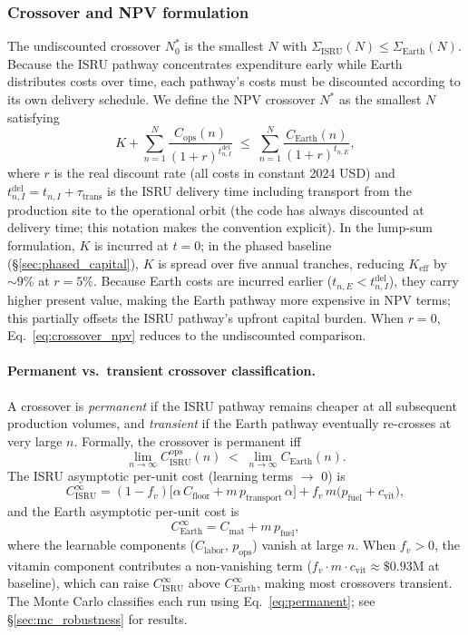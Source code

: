 \documentclass[preprint,12pt]{elsarticle}
\begin{document}
\subsubsection{Crossover and NPV formulation}

The undiscounted crossover $N^*_0$ is the smallest $N$ with $\Sigma_{\mathrm{ISRU}}(N) \leq \Sigma_{\mathrm{Earth}}(N)$. Because the ISRU pathway concentrates expenditure early while Earth distributes costs over time, each pathway's costs must be discounted according to its own delivery schedule. We define the NPV crossover $N^*$ as the smallest $N$ satisfying
\begin{equation}
  K + \sum_{n=1}^{N} \frac{C_{\mathrm{ops}}(n)}{(1+r)^{t_{n,I}^{\mathrm{del}}}} \;\leq\; \sum_{n=1}^{N} \frac{C_{\mathrm{Earth}}(n)}{(1+r)^{t_{n,E}}},
  \label{eq:crossover_npv}
\end{equation}
where $r$ is the real discount rate (all costs in constant 2024 USD) and $t_{n,I}^{\mathrm{del}} = t_{n,I} + \tau_{\mathrm{trans}}$ is the ISRU delivery time including transport from the production site to the operational orbit (the code has always discounted at delivery time; this notation makes the convention explicit). In the lump-sum formulation, $K$ is incurred at $t = 0$; in the phased baseline (\S\ref{sec:phased_capital}), $K$ is spread over five annual tranches, reducing $K_{\mathrm{eff}}$ by ${\sim}9\%$ at $r = 5\%$. Because Earth costs are incurred earlier ($t_{n,E} < t_{n,I}^{\mathrm{del}}$), they carry higher present value, making the Earth pathway more expensive in NPV terms; this partially offsets the ISRU pathway's upfront capital burden. When $r = 0$, Eq.~\ref{eq:crossover_npv} reduces to the undiscounted comparison.

\paragraph{Permanent vs.\ transient crossover classification.} A crossover is \emph{permanent} if the ISRU pathway remains cheaper at all subsequent production volumes, and \emph{transient} if the Earth pathway eventually re-crosses at very large $n$. Formally, the crossover is permanent iff
\begin{equation}
  \lim_{n \to \infty} C_{\mathrm{ISRU}}^{\mathrm{ops}}(n) \;<\; \lim_{n \to \infty} C_{\mathrm{Earth}}(n).
  \label{eq:permanent}
\end{equation}
The ISRU asymptotic per-unit cost (learning terms $\to$ 0) is
\[
  C_{\mathrm{ISRU}}^{\infty} = (1 - f_v)\bigl[\alpha \, C_{\mathrm{floor}} + m \, p_{\mathrm{transport}} \, \alpha\bigr] + f_v \, m \bigl(p_{\mathrm{fuel}} + c_{\mathrm{vit}}\bigr),
\]
and the Earth asymptotic per-unit cost is
\[
  C_{\mathrm{Earth}}^{\infty} = C_{\mathrm{mat}} + m \, p_{\mathrm{fuel}},
\]
where the learnable components ($C_{\mathrm{labor}}$, $p_{\mathrm{ops}}$) vanish at large $n$. When $f_v > 0$, the vitamin component contributes a non-vanishing term ($f_v \cdot m \cdot c_{\mathrm{vit}} \approx \$0.93$M at baseline), which can raise $C_{\mathrm{ISRU}}^{\infty}$ above $C_{\mathrm{Earth}}^{\infty}$, making most crossovers transient. The Monte Carlo classifies each run using Eq.~\ref{eq:permanent}; see \S\ref{sec:mc_robustness} for results.
\end{document}
